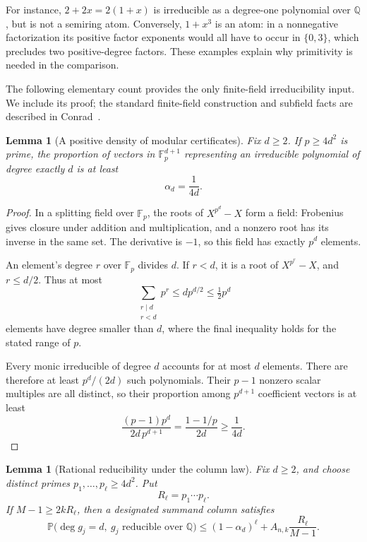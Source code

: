 \documentclass[11pt]{amsart}
\newcommand{\Q}{\mathbb Q}
\newcommand{\F}{\mathbb F}
\newcommand{\Prob}{\mathbb P}
\newtheorem{lemma}[theorem]{Lemma}
\theoremstyle{definition}
\theoremstyle{remark}
\begin{document}
For instance, $2+2x=2(1+x)$ is irreducible as a degree-one polynomial
over $\Q$, but is not a semiring atom. Conversely, $1+x^3$ is an
atom: in a nonnegative factorization its positive factor exponents
would all have to occur in $\{0,3\}$, which precludes two positive-degree
factors. These examples explain why primitivity is needed in the
comparison.

The following elementary count provides the only finite-field
irreducibility input. We include its proof; the standard finite-field
construction and subfield facts are described in Conrad~\cite{Conrad}.

\begin{lemma}[A positive density of modular certificates]\label{lem:finitefield}
Fix $d\ge2$. If $p\ge4d^2$ is prime, the proportion of vectors in
$\F_p^{d+1}$ representing an irreducible polynomial of degree exactly
$d$ is at least
\begin{equation}\label{eq:alphad}
\alpha_d=\frac1{4d}.
\end{equation}
\end{lemma}

\begin{proof}
In a splitting field over $\F_p$, the roots of $X^{p^d}-X$ form a field:
Frobenius gives closure under addition and multiplication, and a
nonzero root has its inverse in the same set. The derivative is $-1$,
so this field has exactly $p^d$ elements.

An element's degree $r$ over $\F_p$ divides $d$. If $r<d$, it is a
root of $X^{p^r}-X$, and $r\le d/2$. Thus at most
\[
\sum_{\substack{r\mid d\\r<d}}p^r\le d p^{d/2}\le\tfrac12p^d
\]
elements have degree smaller than $d$, where the final inequality
holds for the stated range of $p$.

Every monic irreducible of degree $d$ accounts for at most $d$ elements.
There are therefore at least $p^d/(2d)$ such polynomials. Their $p-1$
nonzero scalar multiples are all distinct, so their proportion among
$p^{d+1}$ coefficient vectors is at least
\[
\frac{(p-1)p^d}{2d\,p^{d+1}}
=\frac{1-1/p}{2d}\ge\frac1{4d}.
\]
\end{proof}

\begin{lemma}[Rational reducibility under the column law]
\label{lem:Qreducible}
Fix $d\ge2$, and choose distinct primes
$p_1,\ldots,p_\ell\ge4d^2$. Put
\[
R_\ell=p_1\cdots p_\ell.
\]
If $M-1\ge2kR_\ell$, then a designated summand column satisfies
\begin{equation}\label{eq:Qerror}
\Prob\bigl(\deg g_j=d,\ g_j\text{ reducible over }\Q\bigr)
\le(1-\alpha_d)^\ell
+A_{n,k}\frac{R_\ell}{M-1}.
\end{equation}
\end{lemma}
\end{document}

